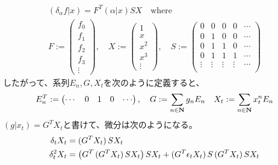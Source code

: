 {\begin{equation*}
\begin{split}
		(\delta_\alpha f|x) = F^T(\alpha|x)SX \quad\text{where } \\
		F := \begin{pmatrix}
			f_0 \\ f_1 \\ f_2 \\ f_3 \\ \vdots
		\end{pmatrix} ,\quad X := \begin{pmatrix}
			1 \\ x \\ x^2 \\ x^3 \\ \vdots
		\end{pmatrix},\quad S := \begin{pmatrix}
			0 & 0 & 0 & 0 & \cdots \\
			0 & 1 & 0 & 0 & \cdots \\
			0 & 1 & 1 & 0 & \cdots \\
			0 & 1 & 1 & 1 & \cdots \\
			\vdots & \vdots & \vdots & \vdots & \cdots \\
		\end{pmatrix}
	\end{split}\end{equation*}
	したがって、系列$E_n,G,X_t$を次のように定義すると、
	\begin{equation*}\begin{split}
		E_n^T := \begin{pmatrix}
			\cdots & 0 & 1 & 0 & \cdots
		\end{pmatrix},\quad G := \sum_{n\in\mathbf{N}} g_nE_n\quad 
		X_t := \sum_{n\in\mathbf{N}} x_t^nE_n
	\end{split}\end{equation*}
	$(g|x_t)=G^TX_t$と書けて、微分は次のようになる。
	\begin{equation*}\begin{split}
		\delta_tX_t &= \mathinner{({G^TX_t})}SX_t \\
		\delta_t^2X_t &= \mathinner{\bigl({G^T\mathinner{({G^TX_t})}SX_t}\bigr)}SX_t
		+ \mathinner{({G^T\epsilon_tX_t})}S\mathinner{({G^TX_t})}SX_t \\
	\end{split}\end{equation*}

}
